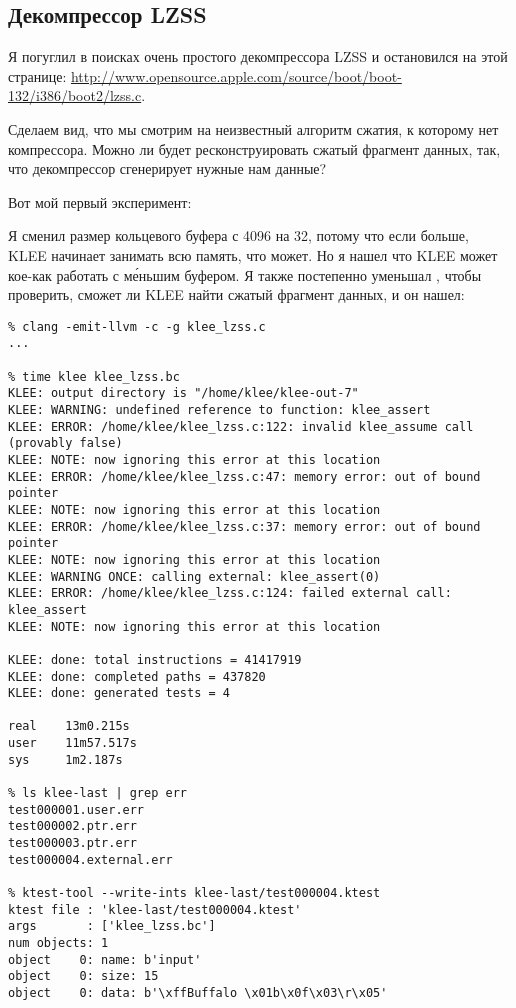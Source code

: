 \subsection{Декомпрессор LZSS}

Я погуглил в поисках очень простого декомпрессора \ac{LZSS} и остановился на этой странице:
\url{http://www.opensource.apple.com/source/boot/boot-132/i386/boot2/lzss.c}.

Сделаем вид, что мы смотрим на неизвестный алгоритм сжатия, к которому нет компрессора.
Можно ли будет ресконструировать сжатый фрагмент данных, так, что декомпрессор сгенерирует нужные нам данные?

Вот мой первый эксперимент:



Я сменил размер кольцевого буфера с 4096 на 32, потому что если больше, KLEE начинает занимать всю память, что может.
Но я нашел что KLEE может кое-как работать с м\'{е}ньшим буфером.
Я также постепенно уменьшал , чтобы проверить, сможет ли KLEE найти сжатый фрагмент данных, и он нашел:

\begin{lstlisting}
% clang -emit-llvm -c -g klee_lzss.c
...

% time klee klee_lzss.bc
KLEE: output directory is "/home/klee/klee-out-7"
KLEE: WARNING: undefined reference to function: klee_assert
KLEE: ERROR: /home/klee/klee_lzss.c:122: invalid klee_assume call (provably false)
KLEE: NOTE: now ignoring this error at this location
KLEE: ERROR: /home/klee/klee_lzss.c:47: memory error: out of bound pointer
KLEE: NOTE: now ignoring this error at this location
KLEE: ERROR: /home/klee/klee_lzss.c:37: memory error: out of bound pointer
KLEE: NOTE: now ignoring this error at this location
KLEE: WARNING ONCE: calling external: klee_assert(0)
KLEE: ERROR: /home/klee/klee_lzss.c:124: failed external call: klee_assert
KLEE: NOTE: now ignoring this error at this location

KLEE: done: total instructions = 41417919
KLEE: done: completed paths = 437820
KLEE: done: generated tests = 4

real    13m0.215s
user    11m57.517s
sys     1m2.187s

% ls klee-last | grep err
test000001.user.err
test000002.ptr.err
test000003.ptr.err
test000004.external.err

% ktest-tool --write-ints klee-last/test000004.ktest
ktest file : 'klee-last/test000004.ktest'
args       : ['klee_lzss.bc']
num objects: 1
object    0: name: b'input'
object    0: size: 15
object    0: data: b'\xffBuffalo \x01b\x0f\x03\r\x05'
\end{lstlisting}

